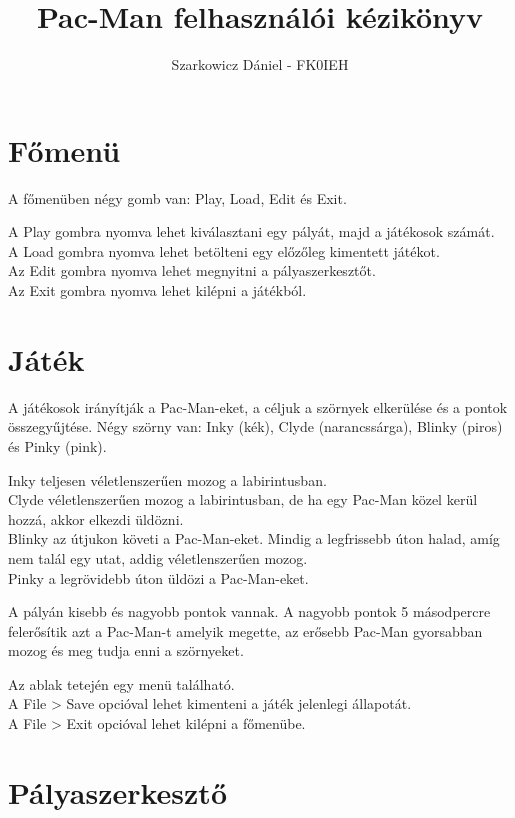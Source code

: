 \documentclass{article}
\title{Pac-Man felhasználói kézikönyv}
\author{Szarkowicz Dániel - FK0IEH}
\date{}
\begin{document}
\maketitle

\section{Főmenü}

A főmenüben négy gomb van: Play, Load, Edit és Exit.

A Play gombra nyomva lehet kiválasztani egy pályát, majd a játékosok számát.\\
A Load gombra nyomva lehet betölteni egy előzőleg kimentett játékot.\\
Az Edit gombra nyomva lehet megnyitni a pályaszerkesztőt.\\
Az Exit gombra nyomva lehet kilépni a játékból.

\section{Játék}

A játékosok irányítják a Pac-Man-eket, a céljuk a szörnyek elkerülése és a
pontok összegyűjtése. Négy szörny van: Inky (kék), Clyde (narancssárga),
Blinky (piros) és Pinky (pink).

Inky teljesen véletlenszerűen mozog a labirintusban.\\
Clyde véletlenszerűen mozog a labirintusban, de ha egy Pac-Man közel kerül
hozzá, akkor elkezdi üldözni.\\
Blinky az útjukon követi a Pac-Man-eket. Mindig a legfrissebb úton halad,
amíg nem talál egy utat, addig véletlenszerűen mozog.\\
Pinky a legrövidebb úton üldözi a Pac-Man-eket.

A pályán kisebb és nagyobb pontok vannak. A nagyobb pontok 5 másodpercre
felerősítik azt a Pac-Man-t amelyik megette, az erősebb Pac-Man gyorsabban
mozog és meg tudja enni a szörnyeket.

Az ablak tetején egy menü található.\\
A File > Save opcióval lehet kimenteni a játék jelenlegi állapotát.\\
A File > Exit opcióval lehet kilépni a főmenübe.

\section{Pályaszerkesztő}
\end{document}

